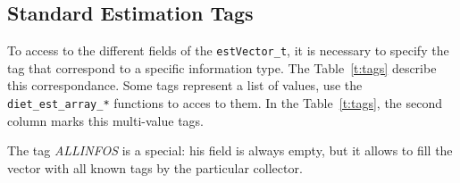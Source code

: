 \subsection{Standard Estimation Tags}\label{sect:estTags}

To access to the different fields of the \texttt{estVector\_t}, it
is necessary to specify the tag that correspond to a specific information type.
The Table~\ref{t:tags} describe this correspondance.
Some tags represent a list of values, use the \texttt{diet\_est\_array\_*} 
functions to acces to them. In the Table~\ref{t:tags}, 
the second column marks this multi-value tags.

The tag \textit{ALLINFOS} is a special: his field is 
always empty, but it allows to fill the vector with all known tags 
by the particular collector.
 
